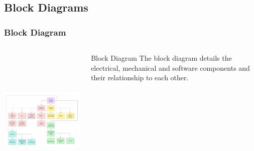 \documentclass[aspectratio=169]{beamer}
\begin{document}
\subsection{Block Diagrams}
\begin{frame}
    \frametitle{Block Diagram}

    \begin{columns}
        \begin{column}{0.70\textwidth}
            \includegraphics[height=7cm]{BlockDiagram}
        \end{column}

        \begin{column}{0.30\textwidth}
            \begin{block}{Block Diagram}
                The block diagram details the electrical, mechanical and software components and their relationship to each other.
            \end{block}
        \end{column}
    \end{columns}


\end{frame}
\end{document}
